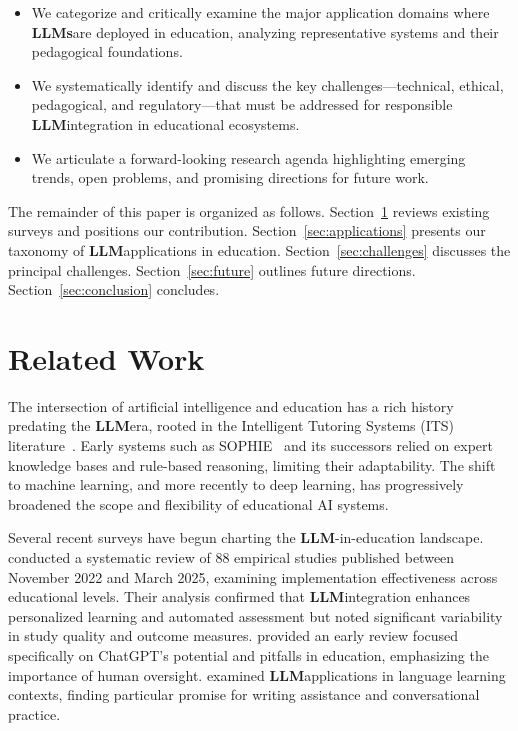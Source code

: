 \documentclass[preprint,12pt]{article}
\newcommand{\LLM}{\textbf{LLM}}
\newcommand{\LLMs}{\textbf{LLMs}}
\theoremstyle{mystyle}
\begin{document}
\begin{itemize}
    \item We categorize and critically examine the major application domains where \LLMs are deployed in education, analyzing representative systems and their pedagogical foundations.
    \item We systematically identify and discuss the key challenges---technical, ethical, pedagogical, and regulatory---that must be addressed for responsible \LLM integration in educational ecosystems.
    \item We articulate a forward-looking research agenda highlighting emerging trends, open problems, and promising directions for future work.
\end{itemize}

The remainder of this paper is organized as follows. Section~\ref{sec:related_work} reviews existing surveys and positions our contribution. Section~\ref{sec:applications} presents our taxonomy of \LLM applications in education. Section~\ref{sec:challenges} discusses the principal challenges. Section~\ref{sec:future} outlines future directions. Section~\ref{sec:conclusion} concludes.

\section{Related Work}
\label{sec:related_work}

The intersection of artificial intelligence and education has a rich history predating the \LLM era, rooted in the Intelligent Tutoring Systems (ITS) literature~\citep{vandLeemput1997intelligent,pane2017effectiveness}. Early systems such as SOPHIE~\citep{brown1977sophie} and its successors relied on expert knowledge bases and rule-based reasoning, limiting their adaptability. The shift to machine learning, and more recently to deep learning, has progressively broadened the scope and flexibility of educational AI systems.

Several recent surveys have begun charting the \LLM-in-education landscape. \citet{arslan2024large} conducted a systematic review of 88 empirical studies published between November 2022 and March 2025, examining implementation effectiveness across educational levels. Their analysis confirmed that \LLM integration enhances personalized learning and automated assessment but noted significant variability in study quality and outcome measures. \citet{kasneci2023chatgpt} provided an early review focused specifically on ChatGPT's potential and pitfalls in education, emphasizing the importance of human oversight. \citet{chassignet2024llm} examined \LLM applications in language learning contexts, finding particular promise for writing assistance and conversational practice.
\end{document}
